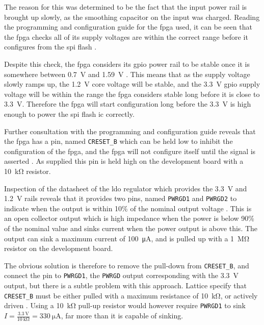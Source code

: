 The reason for this was determined to be the fact that the input power rail is brought up slowly, as the smoothing capacitor on the input was charged. Reading the programming and configuration guide for the \gls{fpga} used, it can be seen that the \gls{fpga} checks all of its supply voltages are within the correct range before it configures from the \gls{spi} flash \cite[p.4]{lattice2016}.

Despite this check, the \gls{fpga} considers its \gls{gpio} power rail to be stable once it is somewhere between \SI{0.7}{\volt} and \SI{1.59}{\volt} \cite[p.3-2]{lattice2017a}. This means that as the supply voltage slowly ramps up, the \SI{1.2}{\volt} core voltage will be stable, and the \SI{3.3}{\volt} \gls{gpio} supply voltage will be within the range the \gls{fpga} considers stable long before it is close to \SI{3.3}{\volt}. Therefore the \gls{fpga} will start configuration long before the \SI{3.3}{\volt} is high enough to power the \gls{spi} flash \gls{ic} correctly.

Further consultation with the programming and configuration guide reveals that the \gls{fpga} has a pin, named \texttt{CRESET\_B} which can be held low to inhibit the configuration of the \gls{fpga}, and the \gls{fpga} will not configure itself until the signal is asserted \cite[p.4]{lattice2016}. As supplied this pin is held high on the development board with a \SI{10}{\kilo\ohm} resistor.

Inspection of the datasheet of the \gls{ldo} regulator which provides the \SI{3.3}{\volt} and \SI{1.2}{\volt} rails reveals that it provides two pins, named \texttt{PWRGD1} and \texttt{PWRGD2} to indicate when the output is within 10\% of the nominal output voltage \cite[p.11]{linear2013}. This is an open collector output which is high impedance when the power is below 90\% of the nominal value and sinks current when the power output is above this. The output can sink a maximum current of \SI{100}{\micro\ampere}, and is pulled up with a \SI{1}{\mega\ohm} resistor on the development board.

The obvious solution is therefore to remove the pull-down from \texttt{CRESET\_B}, and connect the pin to \texttt{PWRGD1}, the \texttt{PWRGD} output corresponding with the \SI{3.3}{\volt} output, but there is a subtle problem with this approach. Lattice specify that \texttt{CRESET\_B} must be either pulled with a maximum resistance of \SI{10}{\kilo\ohm}, or actively driven \cite[p4-1]{lattice2017a}. Using a \SI{10}{\kilo\ohm} pull-up resistor would however require \texttt{PWRGD1} to sink $I=\frac{\SI{3.3}{\volt}}{\SI{10}{\kilo\ohm}}= \SI{330}{\micro\ampere}$, far more than it is capable of sinking.

